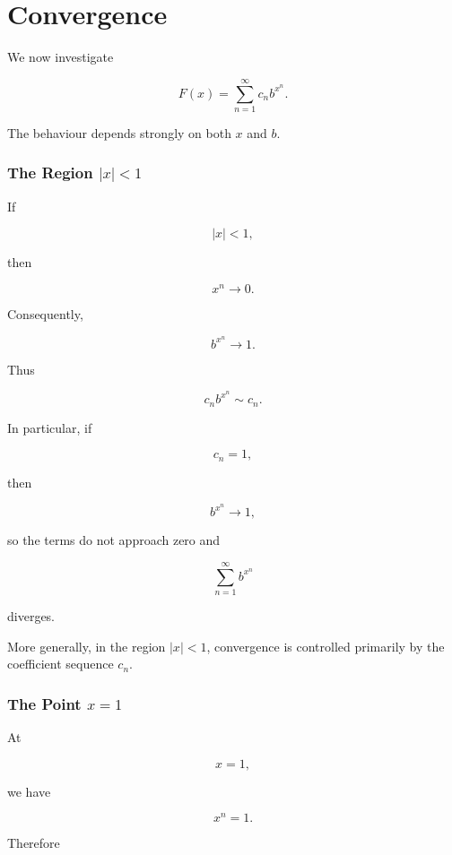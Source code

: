 
\chapter{Convergence}


We now investigate

\[
F(x)
=
\sum_{n=1}^{\infty}
c_n b^{x^n}.
\]

The behaviour depends strongly on both \(x\) and \(b\).

\subsection{The Region \texorpdfstring{$|x|<1$}{|x|<1}}

If

\[
|x|<1,
\]

then

\[
x^n\longrightarrow0.
\]

Consequently,

\[
b^{x^n}\longrightarrow1.
\]

Thus

\[
c_nb^{x^n}
\sim c_n.
\]

In particular, if

\[
c_n=1,
\]

then

\[
b^{x^n}\longrightarrow1,
\]

so the terms do not approach zero and

\[
\sum_{n=1}^{\infty}b^{x^n}
\]

diverges.

More generally, in the region \(|x|<1\), convergence is controlled
primarily by the coefficient sequence \(c_n\).

\subsection{The Point \texorpdfstring{$x=1$}{x=1}}

At

\[
x=1,
\]

we have

\[
x^n=1.
\]

Therefore


